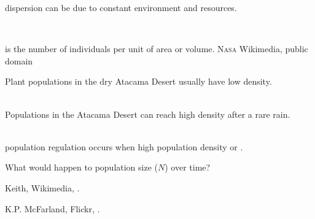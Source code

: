 \documentclass[t]{beamer}
\begin{document}
%
{
	\begin{frame}[t]{ dispersion can be due to constant environment and resources.}
		
		\vfilll 
		
		\tiny \textcolor{white}{Strecosa, Pixabay, .}
	\end{frame}
}
%
{
\begin{frame}[b]{ is the number of individuals per unit of area or volume.}
	\hfill \tiny N\textsc{asa} Wikimedia, public domain
\end{frame}
}
%
{
	\begin{frame}[b]{Plant populations in the dry Atacama Desert usually have low density.}
		\hfill \tiny \textcolor{white}{travfotos, Flickr, }
	\end{frame}
}
%
{
	\begin{frame}[b]{Populations in the Atacama Desert can reach high density after a rare rain.}
		\hfill \tiny \textcolor{white}{Mario Ruiz, \textsc{epa}}
	\end{frame}
}
%
%
%
\begin{frame}{}

	\hangpara {} population regulation occurs when high population density  or .
	
	\hangpara What would happen to population size ($N$) over time?
	
\end{frame}
%
{
\begin{frame}[b]{}
\tiny\textcolor{gray!20!white}{Keith, Wikimedia, .}
\end{frame}
}
%
{
\begin{frame}[b]{}
\tiny\textcolor{gray!20!white}{K.P. McFarland, Flickr, .}
\end{frame}
}
\end{document}
